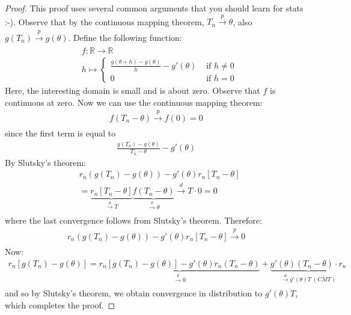 \documentclass[11pt]{scrartcl}
\newcommand{\R}[0]{\mathbb{R}}
\theoremstyle{definition}
\theoremstyle{remark}
\begin{document}
\begin{proof}
	This proof uses several common arguments that you should learn for stats :-). Observe that by the continuous mapping theorem, $T_n \xrightarrow[]{p} \theta$, also $g(T_n) \xrightarrow[]{p} g(\theta)$. Define the following function: 
	\begin{align*}
		& f: \R \rightarrow \R \\
		& h \mapsto \begin{cases}
			\frac{g(\theta + h) - g (\theta)}{h} - g'(\theta) & \text{ if } h \neq 0 \\
			0 	& \text{ if } h = 0 
		\end{cases}	
	\end{align*}
	Here, the interesting domain is small and is about zero. Observe that $f$ is continuous at zero. Now we can use the continuous mapping theorem: 
	\begin{align*}
			f(T_n - \theta) \xrightarrow[]{p} f(0) = 0 
	\end{align*}
	since the first term is equal to 
	\begin{align*}
		\frac{g(T_n) - g(\theta)}{T_n - \theta} - g'(\theta) 		
	\end{align*}
	By Slutsky's theorem: 
	\begin{align*} 
		& r_n (g(T_n) - g(\theta)) - g'(\theta ) r_n [T_n - \theta ] \\ 
		& = \underbrace{r_n [T_n - \theta]}_{\xrightarrow[]{d} T} \underbrace{f(T_n - \theta)}_{\xrightarrow[]{p} \theta} \xrightarrow[]{d} T \cdot 0 = 0 
	\end{align*} 
	where the last convergence follows from Slutsky's theorem. Therefore: 
	\begin{align*}
		r_n (g(T_n) - g(\theta)) - g'(\theta)r_n [T_n - \theta ] \xrightarrow[]{p} 0 	
	\end{align*}
	Now: 
	\begin{align*}
	r_n[g(T_n) - g(\theta)] = \underbrace{r_n [g(T_n) - g(\theta)] - g'(\theta)r_n(T_n - \theta)}_{\xrightarrow[]{p} 0} + \underbrace{g'(\theta)(T_n - \theta) \cdot r_n 	}_{\xrightarrow[]{d} g'(\theta)T\ (CMT)}
	\end{align*}
	and so by Slutsky's theorem, we obtain convergence in distribution to $g'(\theta)T$, which completes the proof.
\end{proof}
\end{document}

